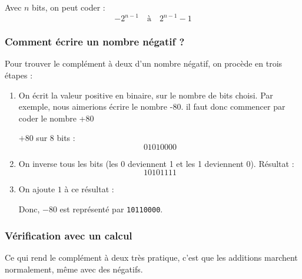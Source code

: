 \documentclass[11pt, a4paper]{book}
\begin{document}
Avec $n$ bits, on peut coder :  
\[
-2^{n-1} \quad \text{à} \quad 2^{n-1}-1
\]

\subsubsection{Comment écrire un nombre négatif ?}

Pour trouver le complément à deux d’un nombre négatif, on procède en trois étapes :

\begin{enumerate}
  \item On écrit la valeur positive en binaire, sur le nombre de bits choisi. Par exemple, nous aimerions écrire le nombre -80. il faut donc commencer par coder le nombre +80
  
  $+80$ sur 8 bits : 
  \[
  01010000
  \]

  \item On inverse tous les bits (les 0 deviennent 1 et les 1 deviennent 0).  
  Résultat : 
  \[
  10101111
  \]

  \item On ajoute $1$ à ce résultat :  

  \begin{center}
\end{center}

  Donc, $-80$ est représenté par \texttt{10110000}.
\end{enumerate}

\subsubsection{Vérification avec un calcul}

Ce qui rend le complément à deux très pratique, c’est que les additions marchent normalement, même avec des négatifs.  
\end{document}
